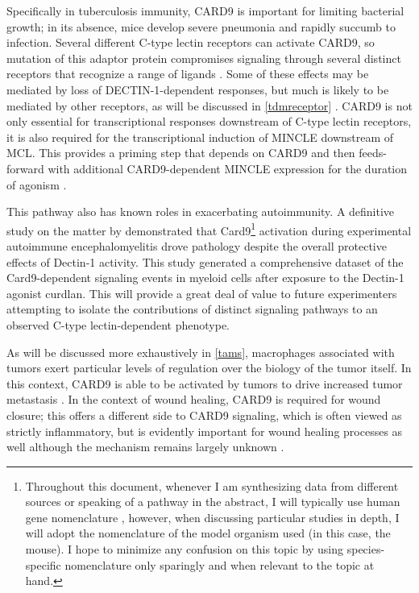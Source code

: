 Specifically in tuberculosis immunity, CARD9 is important for limiting bacterial growth; in its absence, mice develop severe pneumonia and rapidly succumb to infection. Several different C\hyp{}type lectin receptors can activate CARD9, so mutation of this adaptor protein compromises signaling through several distinct receptors that recognize a range of ligands \citep{Wagener2018}. Some of these effects may be mediated by loss of DECTIN\hyp{}1\hyp{}dependent responses, but much is likely to be mediated by other receptors, as will be discussed in \autoref{tdmreceptor} \citep{Marakalala2010, Marakalala2017}. CARD9 is not only essential for transcriptional responses downstream of C\hyp{}type lectin receptors, it is also required for the transcriptional induction of MINCLE downstream of MCL. This provides a priming step that depends on CARD9 and then feeds\hyp{}forward with additional CARD9\hyp{}dependent MINCLE expression for the duration of agonism \citep{Zhao2014}.

This pathway also has known roles in exacerbating autoimmunity. A definitive study on the matter by \citet{Deerhake2021} demonstrated that Card9\footnote{Throughout this document, whenever I am synthesizing data from different sources or speaking of a pathway in the abstract, I will typically use human gene nomenclature \citep{Tweedie2021}, however, when discussing particular studies in depth, I will adopt the nomenclature of the model organism used (in this case, the mouse). I hope to minimize any confusion on this topic by using species\hyp{}specific nomenclature only sparingly and when relevant to the topic at hand.} activation during experimental autoimmune encephalomyelitis drove pathology despite the overall protective effects of Dectin\hyp{}1 activity. This study generated a comprehensive dataset of the Card9\hyp{}dependent signaling events in myeloid cells after exposure to the Dectin\hyp{}1 agonist curdlan. This will provide a great deal of value to future experimenters attempting to isolate the contributions of distinct signaling pathways to an observed C\hyp{}type lectin\hyp{}dependent phenotype.

As will be discussed more exhaustively in \autoref{tams}, macrophages associated with tumors exert particular levels of regulation over the biology of the tumor itself. In this context, CARD9 is able to be activated by tumors to drive increased tumor metastasis \citep{Yang2014b}. In the context of wound healing, CARD9 is required for wound closure; this offers a different side to CARD9 signaling, which is often viewed as strictly inflammatory, but is evidently important for wound healing processes as well although the mechanism remains largely unknown \citep{Kanno2017}.

